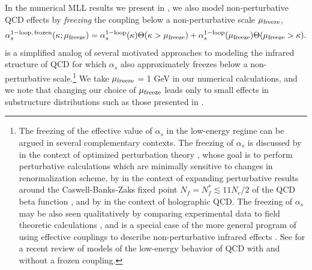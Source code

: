 In the numerical MLL results we present in , we also model non-perturbative QCD effects by \textit{freezing} the coupling below a non-perturbative scale \(\mu_{\rm freeze}\),
\begin{align}
    \alpha^{\rm 1-loop,\,frozen}_s(\kappa; \mu_{\rm freeze})
    =
    \alpha^{\rm 1-loop}_s(\kappa)
    \Theta(\kappa > \mu_{\rm freeze})
    +
    \alpha^{\rm 1-loop}_s(\mu_{\rm freeze})
    \Theta(\mu_{\rm freeze} > \kappa)
    .
    \label{eqn:frozencoupling}
\end{align}
%
 is a simplified analog of several motivated approaches to modeling the infrared structure of QCD for which \(\alpha_s\) also approximately freezes below a non-perturbative scale.\footnote{The freezing of the effective value of \(\alpha_s\) in the low-energy regime can be argued in several complementary contexts.
%
The freezing of \(\alpha_s\) is discussed by  in the context of optimized perturbation theory \cite{Stevenson:1981vj}, whose goal is to perform perturbative calculations which are minimally sensitive to changes in renormalization scheme, by  in the context of expanding perturbative results around the Caswell-Banks-Zaks fixed point \(N_f = N_f^* \lesssim 11 N_c / 2\) of the QCD beta function \cite{Caswell:1974gg,Banks:1981nn}, and by  in the context of holographic QCD.
%
The freezing of \(\alpha_s\) may be also seen qualitatively by comparing experimental data to field theoretic calculations \cite{Deur:2008rf,Deur:2009tj,Binosi:2016nme}, and is a special case of the more general program of using effective couplings to describe non-perturbative infrared effects \cite{Dokshitzer:1995qm,Dokshitzer:1995zt,Dokshitzer:1997ew,Dokshitzer:1997iz,Korchemsky:1999kt}.
%
See  for a recent review of models of the low-energy behavior of QCD with and without a frozen coupling.
}
%
We take \(\mu_{\rm freeze}\) = 1 GeV in our numerical calculations, and we note that changing our choice of \(\mu_{\rm freeze}\) leads only to small effects in substructure distributions such as those presented in .
%
%
%

